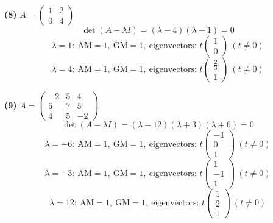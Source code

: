 \noindent\textbf{(8)} $A=\begin{pmatrix}1 & 2 \\ 0 & 4\end{pmatrix}$
\[ \det(A-\lambda I)=\left(\lambda - 4\right) \left(\lambda - 1\right)=0 \]
\[ \lambda=1:\ \text{AM}=1,\ \text{GM}=1,\ \text{eigenvectors: }t\begin{pmatrix}1 \\ 0\end{pmatrix}\ (t\neq0) \]
\[ \lambda=4:\ \text{AM}=1,\ \text{GM}=1,\ \text{eigenvectors: }t\begin{pmatrix}\frac{2}{3} \\ 1\end{pmatrix}\ (t\neq0) \]

\noindent\textbf{(9)} $A=\begin{pmatrix}-2 & 5 & 4 \\ 5 & 7 & 5 \\ 4 & 5 & -2\end{pmatrix}$
\[ \det(A-\lambda I)=\left(\lambda - 12\right) \left(\lambda + 3\right) \left(\lambda + 6\right)=0 \]
\[ \lambda=-6:\ \text{AM}=1,\ \text{GM}=1,\ \text{eigenvectors: }t\begin{pmatrix}-1 \\ 0 \\ 1\end{pmatrix}\ (t\neq0) \]
\[ \lambda=-3:\ \text{AM}=1,\ \text{GM}=1,\ \text{eigenvectors: }t\begin{pmatrix}1 \\ -1 \\ 1\end{pmatrix}\ (t\neq0) \]
\[ \lambda=12:\ \text{AM}=1,\ \text{GM}=1,\ \text{eigenvectors: }t\begin{pmatrix}1 \\ 2 \\ 1\end{pmatrix}\ (t\neq0) \]

